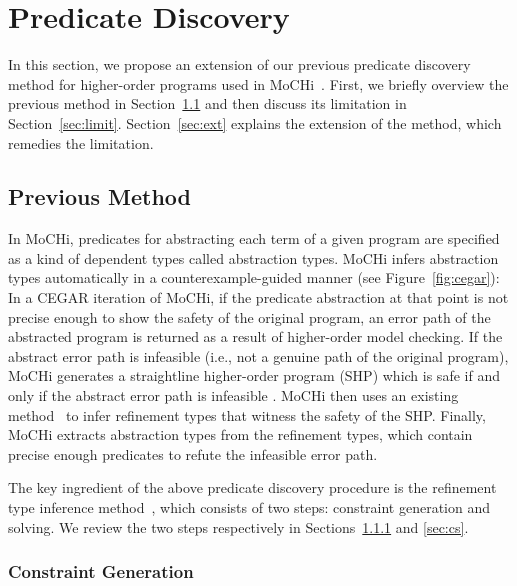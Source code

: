 

\vspace{-5pt}
\section{Predicate Discovery}
\label{sec:refine}

In this section, we propose an extension of our previous predicate
discovery method for higher-order programs used in
MoCHi~\cite{KobayashiPLDI2011}.  First, we briefly overview the previous
method in Section~\ref{sec:prev} and then discuss its limitation in
Section~\ref{sec:limit}. Section~\ref{sec:ext} explains the extension of
the method, which remedies the limitation.

\vspace{-2pt}
\subsection{Previous Method}
\label{sec:prev}

In MoCHi, predicates for abstracting each term of a given program are 
specified as a kind of dependent types called abstraction types.  MoCHi 
infers abstraction types automatically in a counterexample-guided manner 
(see Figure~\ref{fig:cegar}): In a CEGAR iteration of MoCHi, if the 
predicate abstraction at that point is not precise enough to show the 
safety of the original program, an error path of the abstracted program 
is returned as a result of higher-order model checking.  If the abstract 
error path is infeasible (i.e., not a genuine path of the original 
program), MoCHi generates a straightline higher-order program (SHP) 
which is safe if and only if the abstract error path is infeasible . 
MoCHi then uses an existing method~\cite{Unno2009} to infer refinement 
types that witness the safety of the SHP.  Finally, MoCHi extracts 
abstraction types from the refinement types, which contain precise 
enough predicates to refute the infeasible error path.

The key ingredient of the above predicate discovery procedure is the 
refinement type inference method~\cite{Unno2009}, which consists of two 
steps: constraint generation and solving.  We review the two steps 
respectively in Sections~\ref{sec:cg} and \ref{sec:cs}.

\vspace{-2pt}
\subsubsection{Constraint Generation}
\label{sec:cg}

